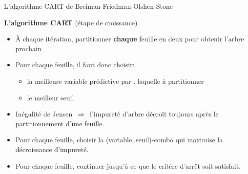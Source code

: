 \begin{frame}{\vskip -0.2cm \large L'algorithme CART de Breiman-Friedman-Olshen-Stone}
\begin{multicols}{2}
	\begin{flushleft}
	\begin{minipage}{5.75cm}
	\vskip -0.5cm
	\scriptsize
	\pause
	\textbf{\normalsize L'algorithme CART} {\tiny(\'etape de croissance)}
	\begin{itemize}
	\item
		\pause
		\`A chaque it\'eration, partitionner \textbf{\color{red}chaque} feuille en deux pour obtenir l'arbre prochain
	\item
		\pause
		Pour chaque feuille, il faut donc choisir:
		\vskip -0.15cm
		\begin{itemize}
		\setlength{\itemindent}{-0.15in}
		\item
			\pause
			{\scriptsize
			\vskip -0.1cm la \guillemotleft\;meilleure \guillemotright\;variable pr\'edictive par
			\vskip -0.1cm {\color{white}.}\!\!\!\!\!\!\!\!\!\!\! laquelle \`a partitionner
			}
		\item
			\pause
			\vskip -0.1cm {\scriptsize le \guillemotleft\;meilleur \guillemotright\;seuil}
		\end{itemize}
	\item
		\pause
		In\'egalit\'e de Jensen \,$\Longrightarrow$\,
		{\color{red}l'impuret\'e d'arbre d\'ecro\^it toujours apr\`es le partitionnement d'une feuille.}
	\item
		\pause
		Pour chaque feuille, choisir la (variable,{\color{white}.}seuil)-combo
		qui maximise la d\'ecroissance d'impuret\'e.
	\item
		\pause
		Pour chaque feuille, continuer jusqu'\`a ce que le crit\`ere d'arr\^et soit satisfait.
	\end{itemize}
	\end{minipage}
	\end{flushleft}

\end{multicols}

\end{frame}
\normalsize

